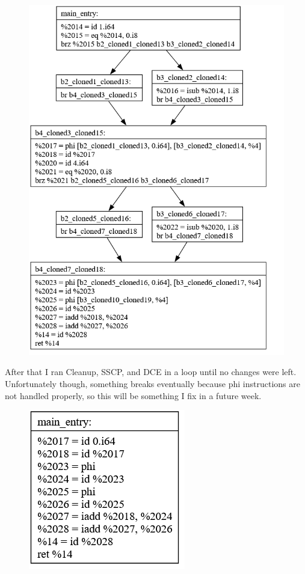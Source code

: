 \documentclass[11pt, a4paper, titlepage]{article}
\begin{document}
\begin{figure}[H]
  \includegraphics[scale=0.3]{images/i37.png}
\end{figure}

After that I ran Cleanup, SSCP, and DCE in a loop until no changes were left. Unfortunately though, something breaks eventually because phi instructions are not handled properly, so this will be something I fix in a future week.

\begin{figure}[H]
  \centering
  \includegraphics[scale=0.3]{images/i38.png}
\end{figure}
\end{document}
